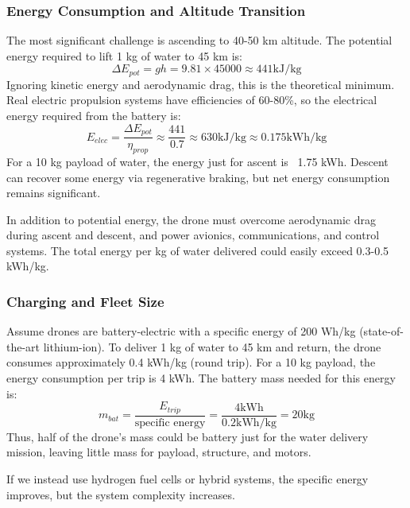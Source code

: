 \subsubsection{Energy Consumption and Altitude Transition}
The most significant challenge is ascending to 40-50 km altitude. The potential energy required to lift 1 kg of water to 45 km is:
\begin{equation}
\Delta E_{pot} = g h = 9.81 \times 45000 \approx 441  \text{kJ/kg}
\end{equation}
Ignoring kinetic energy and aerodynamic drag, this is the theoretical minimum. Real electric propulsion systems have efficiencies of 60-80\%, so the electrical energy required from the battery is:
\begin{equation}
E_{elec} = \frac{\Delta E_{pot}}{\eta_{prop}} \approx \frac{441}{0.7} \approx 630  \text{kJ/kg} \approx 0.175  \text{kWh/kg}
\end{equation}
For a 10 kg payload of water, the energy just for ascent is ~1.75 kWh. Descent can recover some energy via regenerative braking, but net energy consumption remains significant.

In addition to potential energy, the drone must overcome aerodynamic drag during ascent and descent, and power avionics, communications, and control systems. The total energy per kg of water delivered could easily exceed 0.3-0.5 kWh/kg.

\subsubsection{Charging and Fleet Size}
Assume drones are battery-electric with a specific energy of 200 Wh/kg (state-of-the-art lithium-ion). To deliver 1 kg of water to 45 km and return, the drone consumes approximately 0.4 kWh/kg (round trip). For a 10 kg payload, the energy consumption per trip is 4 kWh. The battery mass needed for this energy is:
\begin{equation}
m_{bat} = \frac{E_{trip}}{\text{specific energy}} = \frac{4  \text{kWh}}{0.2  \text{kWh/kg}} = 20  \text{kg}
\end{equation}
Thus, half of the drone's mass could be battery just for the water delivery mission, leaving little mass for payload, structure, and motors.

If we instead use hydrogen fuel cells or hybrid systems, the specific energy improves, but the system complexity increases.

